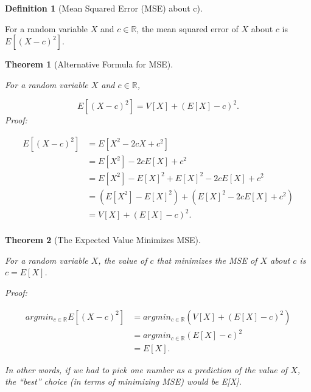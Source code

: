 \documentclass[
]{article}
\newtheorem{theorem}{Theorem}[section]
\theoremstyle{definition}
\newtheorem{definition}{Definition}[section]
\theoremstyle{definition}
\theoremstyle{definition}
\theoremstyle{remark}
\begin{document}
\begin{definition}[Mean Squared Error (MSE) about c]
\protect\hypertarget{def:unlabeled-div-76}{}\label{def:unlabeled-div-76}

For a random variable \(X\) and \(c \in \mathbb{R}\), the mean squared error of \(X\) about \(c\) is \(E[(X-c)^2].\)

\end{definition}

\begin{theorem}[Alternative Formula for MSE]
\protect\hypertarget{thm:unlabeled-div-77}{}\label{thm:unlabeled-div-77}

For a random variable \(X\) and \(c \in \mathbb{R}\),

\[E[(X-c)^2] = V[X] + (E[X] - c)^2.\]
Proof:

\begin{align}
E[(X-c)^2] &= E[X^2 -2cX + c^2] \\
           &= E[X^2] - 2cE[X] + c^2 \\
           &= E[X^2] - E[X]^2 + E[X]^2 - 2cE[X] + c^2 \\
           &= (E[X^2] - E[X]^2) + (E[X]^2- 2cE[X] + c^2) \\
           &= V[X] + (E[X] - c)^2. \\
\end{align}

\end{theorem}

\begin{theorem}[The Expected Value Minimizes MSE]
\protect\hypertarget{thm:unlabeled-div-78}{}\label{thm:unlabeled-div-78}

For a random variable \(X\), the value of \(c\) that minimizes the MSE of \(X\) about \(c\) is \(c = E[X]\).

Proof:

\begin{align}
argmin_{c \in \mathbb{R}}E[(X - c)^2] &= argmin_{c \in \mathbb{R}}(V[X] + (E[X] - c)^2) \\
                                      &= argmin_{c \in \mathbb{R}}(E[X] - c)^2 \\
                                      &= E[X].
\end{align}

In other words, if we had to pick one number as a prediction of the value of \(X\), the ``best'' choice (in terms of minimizing MSE) would be E{[}X{]}.

\end{theorem}
\end{document}
